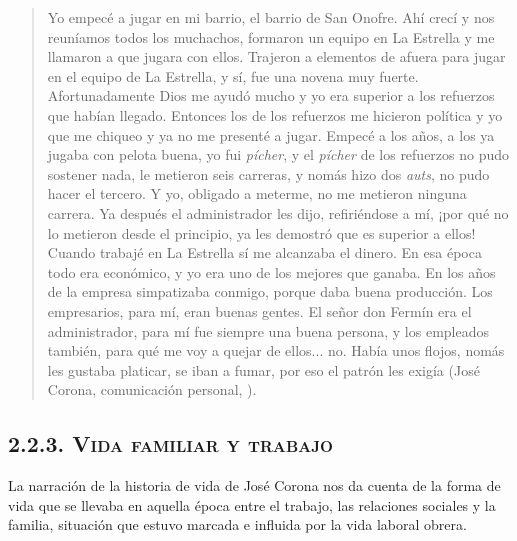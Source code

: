 \documentclass[14pt,letterpaper,twoside]{extbook} %
\begin{document}
\begin{quotation}
\noindent Yo empecé a jugar en mi barrio, el barrio de San Onofre. Ahí crecí y nos reuníamos todos los muchachos, formaron un equipo en La Estrella y me llamaron a que jugara con ellos. Trajeron a elementos de afuera para jugar en el equipo de La Estrella, y sí, fue una novena muy fuerte. Afortunadamente Dios me ayudó mucho y yo era superior a los refuerzos que habían llegado. Entonces los de los refuerzos me hicieron política y yo que me chiqueo y ya no me presenté a jugar. Empecé a los  años, a los  ya jugaba con pelota buena, yo fui \textit{pícher}, y el \textit{pícher} de los refuerzos no pudo sostener nada, le metieron seis carreras, y nomás hizo dos \textit{auts}, no pudo hacer el tercero. Y yo, obligado a meterme, no me metieron ninguna carrera. Ya después el administrador les dijo, refiriéndose a mí, ¡por qué no lo metieron desde el principio, ya les demostró que es superior a ellos! Cuando trabajé en La Estrella sí me alcanzaba el dinero. En esa época todo era económico, y yo era uno de los mejores que ganaba. En los años de  la empresa simpatizaba conmigo, porque daba buena producción. Los empresarios, para mí, eran buenas gentes. El señor don Fermín era el administrador, para mí fue siempre una buena persona, y los empleados también, para qué me voy a quejar de ellos... no. Había unos flojos, nomás les gustaba platicar, se iban a fumar, por eso el patrón les exigía (José Corona, comunicación personal, ).
\end{quotation}

\subsection*{\mdseries\large\textsc{2.2.3. Vida familiar y trabajo}}

\noindent La narración de la historia de vida de José Corona nos da cuenta de la forma de vida que se llevaba en aquella época entre el trabajo, las relaciones sociales y la familia, situación que estuvo marcada e influida por la vida laboral obrera.
\end{document}
